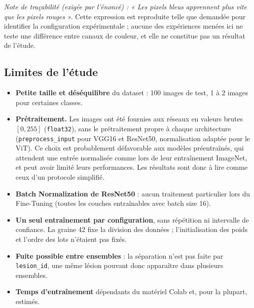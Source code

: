 \documentclass[12pt,a4paper]{article}
\begin{document}
\textit{Note de traçabilité (exigée par l'énoncé) : « Les pixels bleus apprennent plus vite que les pixels rouges ».} Cette expression est reproduite telle que demandée pour identifier la configuration expérimentale ; aucune des expériences menées ici ne teste une différence entre canaux de couleur, et elle ne constitue pas un résultat de l'étude.

\subsection{Limites de l'étude}\label{sec:limites}
\begin{itemize}[nosep]
  \item \textbf{Petite taille et déséquilibre} du dataset : 100 images de test, 1 à 2 images pour certaines classes.
  \item \textbf{Prétraitement.} Les images ont été fournies aux réseaux en valeurs brutes $[0,255]$ (\texttt{float32}), sans le prétraitement propre à chaque architecture (\texttt{preprocess\_input} pour VGG16 et ResNet50, normalisation adaptée pour le ViT). Ce choix est probablement défavorable aux modèles préentraînés, qui attendent une entrée normalisée comme lors de leur entraînement ImageNet, et peut avoir limité leurs performances. Les résultats sont donc à lire comme ceux d'un protocole simplifié.
  \item \textbf{Batch Normalization de ResNet50} : aucun traitement particulier lors du Fine-Tuning (toutes les couches entraînables avec batch size 16).
  \item \textbf{Un seul entraînement par configuration}, sans répétition ni intervalle de confiance. La graine 42 fixe la division des données ; l'initialisation des poids et l'ordre des lots n'étaient pas fixés.
  \item \textbf{Fuite possible entre ensembles} : la séparation n'est pas faite par \texttt{lesion\_id}, une même lésion pouvant donc apparaître dans plusieurs ensembles.
  \item \textbf{Temps d'entraînement} dépendants du matériel Colab et, pour la plupart, estimés.
\end{itemize}
\end{document}
